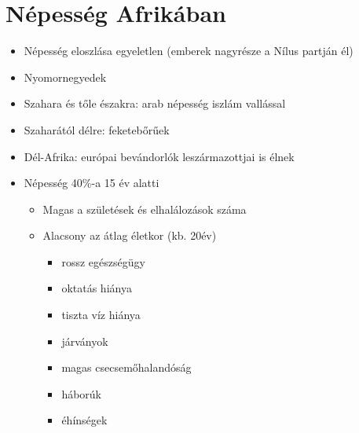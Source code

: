 \documentclass{article}
\begin{document}
\section{Népesség Afrikában}
\begin{itemize}
    \item Népesség eloszlása egyeletlen (emberek nagyrésze a Nílus partján él)
    \item Nyomornegyedek
    \item Szahara és tőle északra: arab népesség iszlám vallással
    \item Szaharától délre: feketebőrűek
    \item Dél-Afrika: európai bevándorlók leszármazottjai is élnek
    \item Népesség 40\%-a 15 év alatti \begin{itemize}
        \item Magas a születések és elhalálozások száma 
        \item Alacsony az átlag életkor (kb. 20év) \begin{itemize}
            \item rossz egészségügy
            \item oktatás hiánya
            \item tiszta víz hiánya
            \item járványok
            \item magas csecsemőhalandóság
            \item háborúk
            \item éhínségek
        \end{itemize}
    \end{itemize}
\end{itemize}
\end{document}
